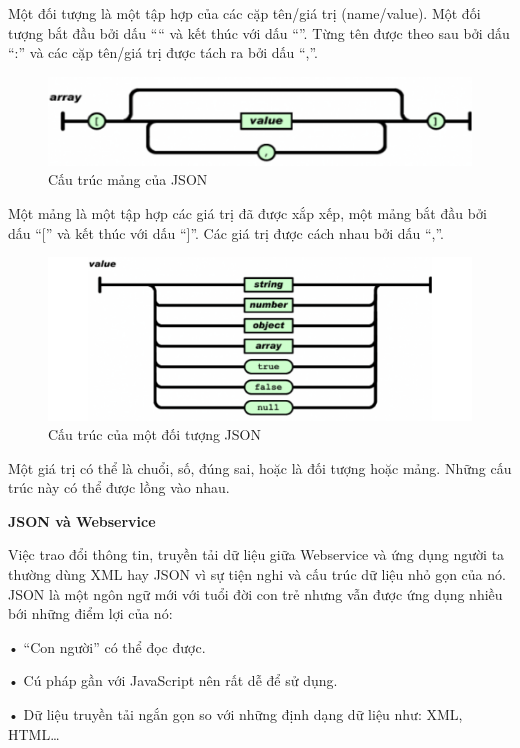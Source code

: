Một đối tượng là một tập hợp của các cặp tên/giá trị (name/value). Một đối tượng bắt đầu bởi dấu “{“ và kết thúc với dấu “}”. Từng tên được theo sau bởi dấu “:” và các cặp tên/giá trị được tách ra bởi dấu “,”.

\begin{figure}[H]
	\centering    
	\includegraphics[width=1.0\textwidth]{json1}
	\caption[Cấu trúc mảng của JSON]{Cấu trúc mảng của JSON}
	\label{fig: json1}
\end{figure}

Một mảng là một tập hợp các giá trị đã được xắp xếp, một mảng bắt đầu bởi dấu “[” và kết thúc với dấu “]”. Các giá trị được cách nhau bởi dấu “,”.
\begin{figure}[H]
	\centering    
	\includegraphics[width=1.0\textwidth]{json2}
	\caption[Cấu trúc của một đối tượng JSON]{Cấu trúc của một đối tượng JSON}
	\label{fig: json2}
\end{figure}

Một giá trị có thể là chuổi, số, đúng sai, hoặc là đối tượng hoặc mảng. Những cấu trúc này có thể được lồng vào nhau.

\textbf{JSON và Webservice}

Việc trao đổi thông tin, truyền tải dữ liệu giữa Webservice và ứng dụng người ta thường dùng XML hay JSON vì sự tiện nghi và cấu trúc dữ liệu nhỏ gọn của nó. JSON là một ngôn ngữ mới với tuổi đời con trẻ nhưng vẫn được ứng dụng nhiều bới những điểm lợi của nó:

• “Con người” có thể đọc được.

• Cú pháp gần với JavaScript nên rất dễ để sử dụng.

• Dữ liệu truyền tải ngắn gọn so với những định dạng dữ liệu như: XML, HTML…

